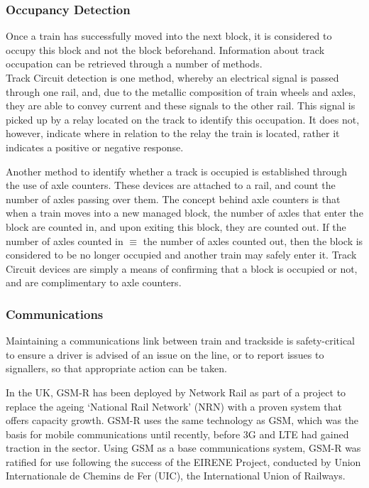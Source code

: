 \documentclass[twoside,11pt,a4paper]{article}
\begin{document}
\subsubsection{Occupancy Detection}
Once a train has successfully moved into the next block, it is considered to occupy this block and not the block beforehand. Information about track occupation can be retrieved through a number of methods.\\Track Circuit detection is one method, whereby an electrical signal is passed through one rail, and, due to the metallic composition of train wheels and axles, they are able to convey current and these signals to the other rail. This signal is picked up by a relay located on the track to identify this occupation. It does not, however, indicate where in relation to the relay the train is located, rather it indicates a positive or negative response.

Another method to identify whether a track is occupied is established through the use of axle counters. These devices are attached to a rail, and count the number of axles passing over them. The concept behind axle counters is that when a train moves into a new managed block, the number of axles that enter the block are counted in, and upon exiting this block, they are counted out. If the number of axles counted in $\equiv$ the number of axles counted out, then the block is considered to be no longer occupied and another train may safely enter it. Track Circuit devices are simply a means of confirming that a block is occupied or not, and are complimentary to axle counters.
\subsubsection{Communications}
Maintaining a communications link between train and trackside is safety-critical to ensure a driver is advised of an issue on the line, or to report issues to signallers, so that appropriate action can be taken. 

In the UK, GSM-R has been deployed by Network Rail as part of a project to replace the ageing `National Rail Network' (NRN) with a proven system that offers capacity growth. GSM-R uses the same technology as GSM, which was the basis for mobile communications until recently, before 3G and LTE had gained traction in the sector. Using GSM as a base communications system, GSM-R was ratified for use following the success of the EIRENE Project, conducted by Union Internationale de Chemins de Fer (UIC), the International Union of Railways.
\end{document}

